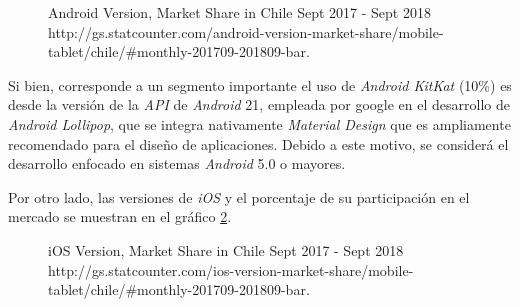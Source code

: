 \begin{figure}[H]
	\centering
	\caption[Android Version, Market Share in Chile Sept 2017 - Sept 2018.]{Android Version, Market Share in Chile Sept 2017 - Sept 2018 \\ http://gs.statcounter.com/android-version-market-share/mobile-tablet/chile/\#monthly-201709-201809-bar.}
	\label{chart:Android Version}
	\begin{bchart}[step=10, max=100, width=.7\textwidth, unit=\%]
	\end{bchart}
\end{figure}

Si bien, corresponde a un segmento importante el uso de \emph{Android KitKat} (10\%) es desde la versión de la \emph{API} de \emph{Android} 21, empleada por google en el desarrollo de \emph{Android Lollipop}, que se integra nativamente \emph{Material Design} que es ampliamente recomendado para el diseño de aplicaciones.  Debido a este motivo, se considerá el desarrollo enfocado en sistemas \emph{Android} 5.0 o mayores.

Por otro lado, las versiones de \emph{iOS} y el porcentaje de su participación en el mercado se muestran en el gráfico \ref{chart:iOS Version}.

\begin{figure}[H]
	\centering
	\caption[iOS Version, Market Share in Chile Sept 2017 - Sept 2018.]{iOS Version, Market Share in Chile Sept 2017 - Sept 2018 \\ http://gs.statcounter.com/ios-version-market-share/mobile-tablet/chile/\#monthly-201709-201809-bar.}
	\label{chart:iOS Version}
	\begin{bchart}[step=10, max=100, width=.8\textwidth, unit=\%]
	\end{bchart}
\end{figure}

